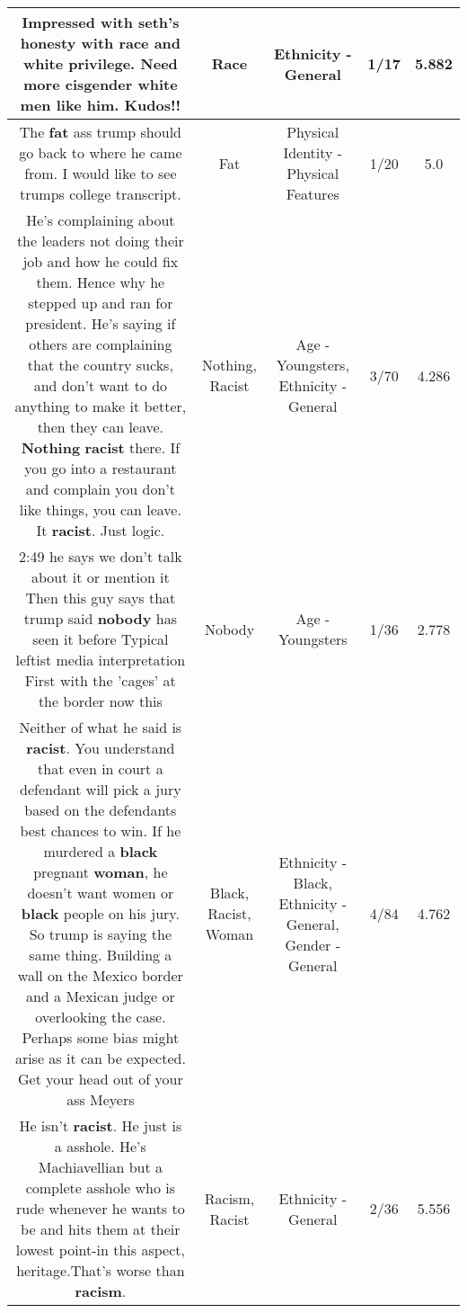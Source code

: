 \documentclass[11pt]{article}
\newlength\mylength
\begin{document}
\begin{center}
\begin{longtable}{|C{.65\mylength}|C{.30\mylength}|C{.12\mylength}|C{.12\mylength}|C{.12\mylength}|}
  \small Impressed with seth's honesty with \textbf{race} and white privilege. Need more cisgender white men like him. Kudos!!\normalsize   & Race & Ethnicity - General & 1/17 & 5.882 \\  \hline
  \small The \textbf{fat} ass trump should go back to where he came from.  I would like to see trumps college transcript.\normalsize   & Fat & Physical Identity - Physical Features & 1/20 & 5.0 \\  \hline
  \small He's complaining about the leaders not doing their job and how he could fix them. Hence why he stepped up and ran for president. He's saying if others are complaining that the country sucks, and don't want to do anything to make it better, then they can leave. \textbf{Nothing} \textbf{racist} there. If you go into a restaurant and complain you don't like things, you can leave.  It \textbf{racist}. Just logic.\normalsize   & Nothing, Racist & Age - Youngsters, Ethnicity - General & 3/70 & 4.286 \\  \hline
  \small 2:49 he says we don't talk about it or mention it Then this guy says that trump said \textbf{nobody} has seen it before Typical leftist media interpretation First with the 'cages' at the border now this\normalsize   & Nobody & Age - Youngsters & 1/36 & 2.778 \\  \hline
  \small Neither of what he said is \textbf{racist}. You understand that even in court a defendant will pick a jury based on the defendants best chances to win. If he murdered a \textbf{black} pregnant \textbf{woman}, he doesn't want women or \textbf{black} people on his jury. So trump is saying the same thing. Building a wall on the Mexico border and a Mexican judge or overlooking the case. Perhaps some bias might arise as it can be expected. Get your head out of your ass Meyers\normalsize   & Black, Racist, Woman & Ethnicity - Black, Ethnicity - General, Gender - General & 4/84 & 4.762 \\  \hline
  \small He isn't \textbf{racist}. He just is a asshole. He's Machiavellian but a  complete asshole who is rude  whenever he wants  to be  and hits them  at their lowest point-in this aspect, heritage.That's worse than \textbf{racism}.\normalsize   & Racism, Racist & Ethnicity - General & 2/36 & 5.556 \\  \hline

\end{longtable}
\end{center}
\end{document}
